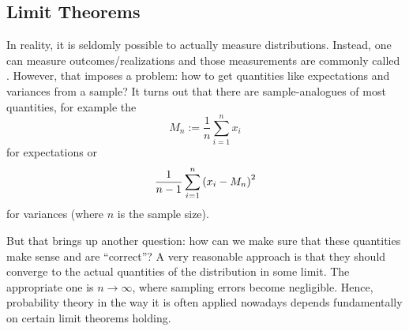 \begin{ex}[Quiz among Students]
\end{ex}



	\subsection{Limit Theorems}\label{subsec:limit_thms}
In reality, it is seldomly possible to actually measure distributions. Instead, one can measure outcomes/realizations and those measurements are commonly called . However, that imposes a problem: how to get quantities like expectations and variances from a sample? It turns out that there are sample-analogues of most quantities, for example the 
\begin{equation}\label{eq:sample_mean}
M_n := \frac{1}{n} \sum_{i = 1}^n x_i
\end{equation}
for expectations or
\begin{equation}
\frac{1}{n - 1} \sum_{i = 1}^n \qty(x_i - M_n)^2
\end{equation}
for variances (where $n$ is the sample size).


But that brings up another question: how can we make sure that these quantities make sense and are \enquote{correct}? A very reasonable approach is that they should converge to the actual quantities of the distribution in some limit. The appropriate one is $n \rightarrow \infty$, where sampling errors become negligible. Hence, probability theory in the way it is often applied nowadays depends fundamentally on certain limit theorems holding.\\


